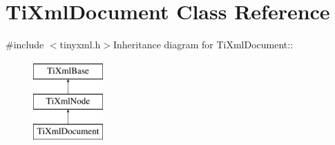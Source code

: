 \hypertarget{class_ti_xml_document}{
\section{TiXmlDocument Class Reference}
\label{class_ti_xml_document}
}


{\ttfamily \#include $<$tinyxml.h$>$}Inheritance diagram for TiXmlDocument::\begin{figure}[H]
\begin{center}
\leavevmode
\includegraphics[height=3cm]{class_ti_xml_document}
\end{center}
\end{figure}

